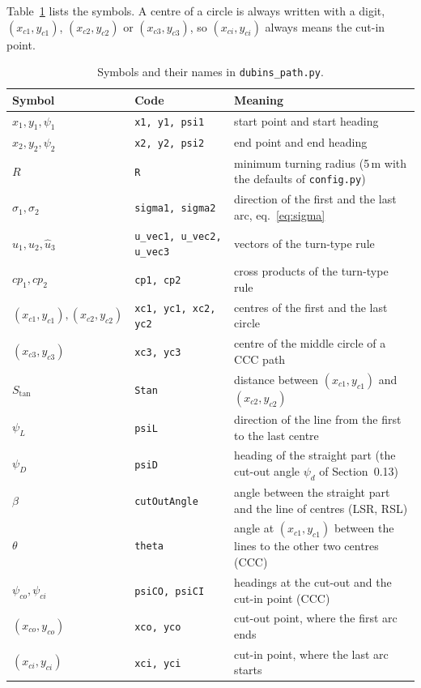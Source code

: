 \documentclass[10pt]{article}
\newcommand{\code}[1]{\texttt{#1}}
\newcommand{\Stan}{S_{\tan}}
\begin{document}
Table~\ref{tab:notation} lists the symbols. A centre of a circle is always written with a digit,
$(x_{c1}, y_{c1})$, $(x_{c2}, y_{c2})$ or $(x_{c3}, y_{c3})$, so $(x_{ci}, y_{ci})$ always means the cut-in point.

\begin{table}[t]
\centering
\small
\caption{Symbols and their names in \code{dubins\_path.py}.}
\label{tab:notation}
\begin{tabularx}{\textwidth}{@{}l l >{\raggedright\arraybackslash}X@{}}
\toprule
Symbol & Code & Meaning \\
\midrule
$x_1, y_1, \psi_1$ & \code{x1, y1, psi1} & start point and start heading \\
$x_2, y_2, \psi_2$ & \code{x2, y2, psi2} & end point and end heading \\
$R$ & \code{R} & minimum turning radius (5\,m with the defaults of \code{config.py}) \\
$\sigma_1, \sigma_2$ & \code{sigma1, sigma2} & direction of the first and the last arc, eq.~\eqref{eq:sigma} \\
$\hat{u}_1, u_2, \hat{u}_3$ & \code{u\_vec1, u\_vec2, u\_vec3} & vectors of the turn-type rule \\
$cp_1, cp_2$ & \code{cp1, cp2} & cross products of the turn-type rule \\
$(x_{c1}, y_{c1}), (x_{c2}, y_{c2})$ & \code{xc1, yc1, xc2, yc2} & centres of the first and the last circle \\
$(x_{c3}, y_{c3})$ & \code{xc3, yc3} & centre of the middle circle of a CCC path \\
$\Stan$ & \code{Stan} & distance between $(x_{c1}, y_{c1})$ and $(x_{c2}, y_{c2})$ \\
$\psi_L$ & \code{psiL} & direction of the line from the first to the last centre \\
$\psi_D$ & \code{psiD} & heading of the straight part (the cut-out angle $\psi_d$ of Section~0.13) \\
$\beta$ & \code{cutOutAngle} & angle between the straight part and the line of centres (LSR, RSL) \\
$\theta$ & \code{theta} & angle at $(x_{c1}, y_{c1})$ between the lines to the other two centres (CCC) \\
$\psi_{co}, \psi_{ci}$ & \code{psiCO, psiCI} & headings at the cut-out and the cut-in point (CCC) \\
$(x_{co}, y_{co})$ & \code{xco, yco} & cut-out point, where the first arc ends \\
$(x_{ci}, y_{ci})$ & \code{xci, yci} & cut-in point, where the last arc starts \\

\end{tabularx}
\end{table}
\end{document}
